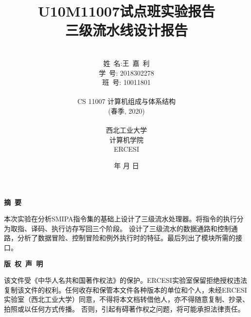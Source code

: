 \documentclass[UTF8]{ctexart}
\begin{document}
\renewcommand{\contentsname}{目\ 录}
\renewcommand{\appendixname}{附录}
\renewcommand{\refname}{参考文献} 
\renewcommand{\figurename}{图}
\renewcommand{\tablename}{表}
\renewcommand{\today}{\number\year 年 \number\month 月 \number\day 日}

\title{{\Huge U10M11007试点班实验报告{\large\linebreak\\}}{\Large 三级流水线设计报告\linebreak\linebreak}}
\author{\\姓\ 名:王\ 嘉\ 利\\
学\ 号: 2018302278\\
班\ 号: 10011801\\\\
CS 11007 计算机组成与体系结构\\
(春季, 2020)\\\\
西北工业大学\\
计算机学院\\
ERCESI}
\date{\today}
\maketitle
\newpage

\begin{center}
{\Large\bf{摘\ 要\\}}
\end{center}
本次实验在分析SMIPA指令集的基础上设计了三级流水处理器。将指令的执行分为取指、译码、执行访存写回三个阶段。
设计了三级流水的数据通路和控制通路，分析了数据冒险、控制冒险和例外执行时的特征。最后列出了模块所需的接口。
\newpage
\begin{center}
{\Large\bf{版\ 权\ 声\ 明\\}}
\end{center}
该文件受《中华人名共和国著作权法》的保护。ERCESI实验室保留拒绝授权违法复制该文件的权利。任何收存和保管本文件各种版本的单位和个人，未经ERCESI实验室（西北工业大学）同意，不得将本文档转借他人，亦不得随意复制、抄录、拍照或以任何方式传播。 否则，引起有碍著作权之问题，将可能承担法律责任。\newpage
\begin{center}
\tableofcontents\label{c}
\end{center}
\newpage
\end{document}
